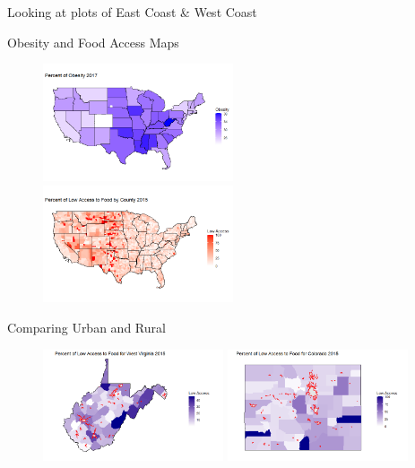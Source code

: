 \documentclass{beamer} %
\begin{document}
\begin{frame}{Looking at plots of East Coast & West Coast}

\begin{frame}{Obesity and Food Access Maps}
\begin{figure}
   \includegraphics[width=0.5\textwidth]{Obesity_Map.jpg}
   \hfill
   \includegraphics[width=0.5\textwidth]{Food_Access.jpg}
\end{figure}
\end{frame}


 
\begin{frame}{Comparing Urban and Rural}
\begin{figure}
   \includegraphics[width=0.475\textwidth]{WV_Map.jpg}
   \hfill
   \includegraphics[width=0.475\textwidth]{CO_Map.jpg}
\end{figure}
\end{frame}



\end{frame}
\end{document}
